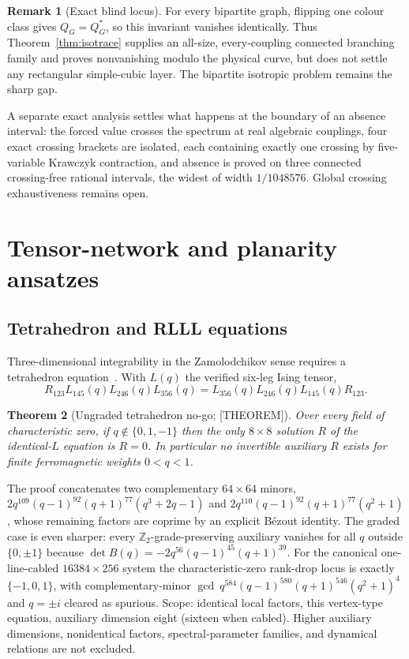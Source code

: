 \documentclass[11pt]{article}
\newtheorem{theorem}{Theorem}[section]
\theoremstyle{definition}
\newtheorem{remark}[theorem]{Remark}
\newcommand{\Zb}{\mathbb{Z}}
\begin{document}
\begin{remark}[Exact blind locus]
For every bipartite graph, flipping one colour class gives $Q_G=Q_G^*$, so this invariant vanishes
identically. Thus Theorem~\ref{thm:isotrace} supplies an all-size, every-coupling connected branching
family and proves nonvanishing modulo the physical curve, but does not settle any rectangular
simple-cubic layer. The bipartite isotropic problem remains the sharp gap.
\end{remark}

A separate exact analysis settles what happens at the boundary of an absence interval: the forced
value crosses the spectrum at real algebraic couplings, four exact crossing brackets are isolated,
each containing exactly one crossing by five-variable Krawczyk contraction, and absence is proved on
three connected crossing-free rational intervals, the widest of width $1/1048576$. Global crossing
exhaustiveness remains open.

\section{Tensor-network and planarity ansatzes}

\subsection{Tetrahedron and RLLL equations}\label{sec:tetra}
Three-dimensional integrability in the Zamolodchikov sense requires a tetrahedron
equation~\cite{zamolodchikov1980,zamolodchikov1981,baxter1986}. With $L(q)$ the verified six-leg
Ising tensor,
\[
R_{123}L_{145}(q)L_{246}(q)L_{356}(q)=L_{356}(q)L_{246}(q)L_{145}(q)R_{123}.
\]

\begin{theorem}[Ungraded tetrahedron no-go; {[THEOREM]}]\label{thm:tetra}
Over every field of characteristic zero, if $q\notin\{0,1,-1\}$ then the only $8\times8$ solution
$R$ of the identical-$L$ equation is $R=0$. In particular no invertible auxiliary $R$ exists for
finite ferromagnetic weights $0<q<1$.
\end{theorem}

The proof concatenates two complementary $64\times64$ minors,
$2q^{109}(q-1)^{92}(q+1)^{77}(q^3+2q-1)$ and $2q^{110}(q-1)^{92}(q+1)^{77}(q^2+1)$, whose remaining
factors are coprime by an explicit B\'ezout identity. The graded case is even sharper: every
$\Zb_2$-grade-preserving auxiliary vanishes for all $q$ outside $\{0,\pm1\}$ because
$\det B(q)=-2q^{56}(q-1)^{45}(q+1)^{39}$. For the canonical one-line-cabled $16384\times256$ system
the characteristic-zero rank-drop locus is exactly $\{-1,0,1\}$, with complementary-minor
$\gcd\ q^{584}(q-1)^{580}(q+1)^{546}(q^2+1)^4$ and $q=\pm i$ cleared as spurious. Scope: identical
local factors, this vertex-type equation, auxiliary dimension eight (sixteen when cabled). Higher
auxiliary dimensions, nonidentical factors, spectral-parameter families, and dynamical relations are
not excluded.
\end{document}
